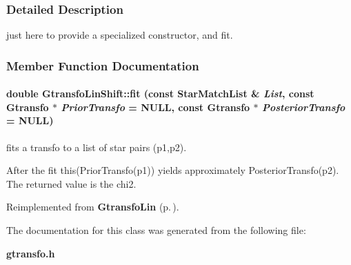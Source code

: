 \subsubsection{Detailed Description}
just here to provide a specialized constructor, and fit.



\subsubsection{Member Function Documentation}
\paragraph{\setlength{\rightskip}{0pt plus 5cm}double Gtransfo\-Lin\-Shift::fit (const Star\-Match\-List \& {\em List}, const {\bf Gtransfo} $\ast$ {\em Prior\-Transfo} = NULL, const {\bf Gtransfo} $\ast$ {\em Posterior\-Transfo} = NULL)\hspace{0.3cm}{\tt  [virtual]}}\hfill\label{class_gtransfolinshift_a2}


fits a transfo to a list of star pairs (p1,p2).

After the fit this(Prior\-Transfo(p1)) yields approximately Posterior\-Transfo(p2). The returned value is the chi2. 

Reimplemented from {\bf Gtransfo\-Lin} {\rm (p.\,\pageref{class_gtransfolin_a9})}.

The documentation for this class was generated from the following file:\begin{CompactItemize}
\item 
{\bf gtransfo.h}\end{CompactItemize}

